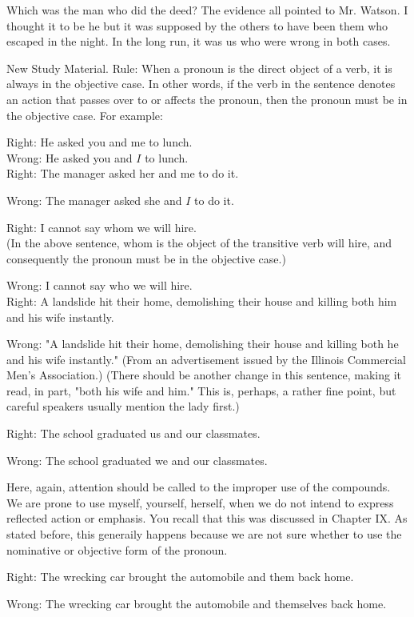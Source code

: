 \documentclass[10pt]{article}
\begin{document}
Which was the man who did the deed? The evidence all pointed to Mr. Watson. I thought it to be he but it was supposed by the others to have been them who escaped in the night. In the long run, it was us who were wrong in both cases.

New Study Material. Rule: When a pronoun is the direct object of a verb, it is always in the objective case. In other words, if the verb in the sentence denotes an action that passes over to or affects the pronoun, then the pronoun must be in the objective case. For example:

Right: He asked you and me to lunch.\\
Wrong: He asked you and $I$ to lunch.\\
Right: The manager asked her and me to do it.

Wrong: The manager asked she and $I$ to do it.

Right: I cannot say whom we will hire.\\
(In the above sentence, whom is the object of the transitive verb will hire, and consequently the pronoun must be in the objective case.)

Wrong: I cannot say who we will hire.\\
Right: A landslide hit their home, demolishing their house and killing both him and his wife instantly.

Wrong: "A landslide hit their home, demolishing their house and killing both he and his wife instantly." (From an advertisement issued by the Illinois Commercial Men's Association.) (There should be another change in this sentence, making it read, in part, "both his wife and him." This is, perhaps, a rather fine point, but careful speakers usually mention the lady first.)

Right: The school graduated us and our classmates.

Wrong: The school graduated we and our classmates.

Here, again, attention should be called to the improper use of the compounds. We are prone to use myself, yourself, herself, when we do not intend to express reflected action or emphasis. You recall that this was discussed in Chapter IX. As stated before, this generaily happens because we are not sure whether to use the nominative or objective form of the pronoun.

Right: The wrecking car brought the automobile and them back home.

Wrong: The wrecking car brought the automobile and themselves back home.
\end{document}
